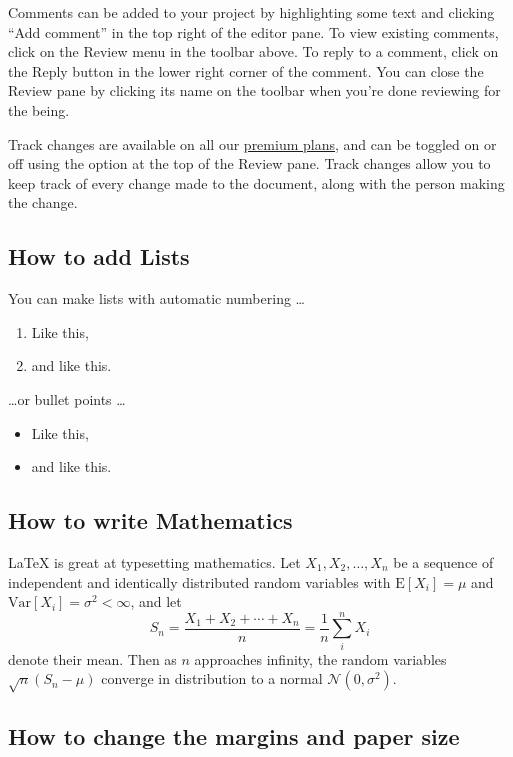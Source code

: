 \documentclass{article}
\begin{document}
Comments can be added to your project by highlighting some text and clicking ``Add comment'' in the top right of the editor pane. To view existing comments, click on the Review menu in the toolbar above. To reply to a comment, click on the Reply button in the lower right corner of the comment. You can close the Review pane by clicking its name on the toolbar when you're done reviewing for the  being.

Track changes are available on all our \href{https://www.overleaf.com/user/subscription/plans}{premium plans}, and can be toggled on or off using the option at the top of the Review pane. Track changes allow you to keep track of every change made to the document, along with the person making the change.

\subsection{How to add Lists}

You can make lists with automatic numbering \dots

\begin{enumerate}
\item Like this,
\item and like this.
\end{enumerate}
\dots or bullet points \dots
\begin{itemize}
\item Like this,
\item and like this.
\end{itemize}

\subsection{How to write Mathematics}

\LaTeX{} is great at typesetting mathematics. Let $X_1, X_2, \ldots, X_n$ be a sequence of independent and identically distributed random variables with $\text{E}[X_i] = \mu$ and $\text{Var}[X_i] = \sigma^2 < \infty$, and let
\[S_n = \frac{X_1 + X_2 + \cdots + X_n}{n}
      = \frac{1}{n}\sum_{i}^{n} X_i\]
denote their mean. Then as $n$ approaches infinity, the random variables $\sqrt{n}(S_n - \mu)$ converge in distribution to a normal $\mathcal{N}(0, \sigma^2)$.


\subsection{How to change the margins and paper size}
\end{document}
